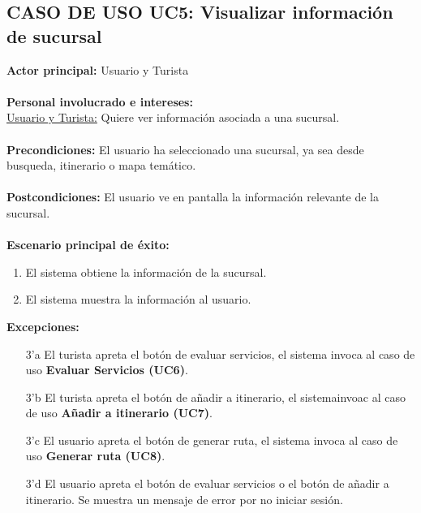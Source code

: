 \documentclass[12pt]{article}
\begin{document}
\subsection{\textbf{CASO DE USO UC5:} Visualizar información de sucursal }
\textbf{Actor principal:} Usuario y Turista\\
\\
\textbf{Personal involucrado e intereses: }\\\underline{Usuario y Turista:} Quiere ver información asociada a una sucursal.\\
\\
\textbf{Precondiciones:} El usuario ha seleccionado una sucursal, ya sea desde busqueda, itinerario o mapa temático.\\
\\
\textbf{Postcondiciones:} El usuario ve en pantalla la información relevante de la sucursal.\\
\\
\textbf{Escenario principal de éxito:}
\begin{enumerate}
\item El sistema obtiene la información de la sucursal.
\item El sistema muestra la información al usuario.
\end{enumerate}
\textbf{Excepciones:}
\begin{enumerate}
\item[3'a] El turista apreta el botón de evaluar servicios, el sistema invoca al caso de uso \textbf{Evaluar Servicios (UC6)}. 
\item[3'b] El turista apreta el botón de añadir a itinerario, el sistemainvoac al caso de uso \textbf{Añadir a itinerario (UC7)}.
\item[3'c] El usuario apreta el botón de generar ruta, el sistema invoca al caso de uso \textbf{Generar ruta (UC8)}.
\item[3'd] El usuario apreta el botón de evaluar servicios o el botón de añadir a itinerario. Se muestra un mensaje de error por no iniciar sesión.
\end{enumerate}
\newpage
\end{document}
